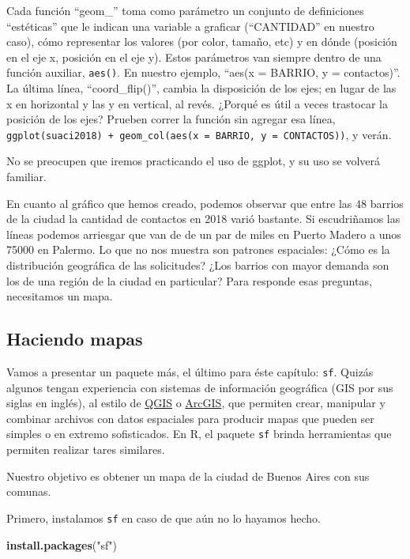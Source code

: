 \documentclass[]{book}
\newenvironment{Shaded}{\begin{snugshade}}{\end{snugshade}}
\newcommand{\KeywordTok}[1]{\textcolor[rgb]{0.13,0.29,0.53}{\textbf{#1}}}
\newcommand{\StringTok}[1]{\textcolor[rgb]{0.31,0.60,0.02}{#1}}
\newcommand{\NormalTok}[1]{#1}
\begin{document}
Cada función ``geom\_'' toma como parámetro un conjunto de definiciones
``estéticas'' que le indican una variable a graficar (``CANTIDAD'' en
nuestro caso), cómo representar los valores (por color, tamaño, etc) y
en dónde (posición en el eje x, posición en el eje y). Estos parámetros
van siempre dentro de una función auxiliar, \texttt{aes()}. En nuestro
ejemplo, ``aes(x = BARRIO, y = contactos)''. La última línea,
``coord\_flip()'', cambia la disposición de los ejes; en lugar de las x
en horizontal y las y en vertical, al revés. ¿Porqué es útil a veces
trastocar la posición de los ejes? Prueben correr la función sin agregar
esa línea,
\texttt{ggplot(suaci2018)\ +\ geom\_col(aes(x\ =\ BARRIO,\ y\ =\ CONTACTOS))},
y verán.

No se preocupen que iremos practicando el uso de ggplot, y su uso se
volverá familiar.

En cuanto al gráfico que hemos creado, podemos observar que entre las 48
barrios de la ciudad la cantidad de contactos en 2018 varió bastante. Si
escudriñamos las líneas podemos arriesgar que van de de un par de miles
en Puerto Madero a unos 75000 en Palermo. Lo que no nos muestra son
patrones espaciales: ¿Cómo es la distribución geográfica de las
solicitudes? ¿Los barrios con mayor demanda son los de una región de la
ciudad en particular? Para responde esas preguntas, necesitamos un mapa.

\subsection{Haciendo mapas}\label{haciendo-mapas}

Vamos a presentar un paquete más, el último para éste capítulo:
\texttt{sf}. Quizás algunos tengan experiencia con sistemas de
información geográfica (GIS por sus siglas en inglés), al estilo de
\href{https://qgis.org/en/site/}{QGIS} o
\href{https://www.arcgis.com/features/index.html}{ArcGIS}, que permiten
crear, manipular y combinar archivos con datos espaciales para producir
mapas que pueden ser simples o en extremo sofisticados. En R, el paquete
\texttt{sf} brinda herramientas que permiten realizar tares similares.

Nuestro objetivo es obtener un mapa de la ciudad de Buenos Aires con sus
comunas.

Primero, instalamos \texttt{sf} en caso de que aún no lo hayamos hecho.

\begin{Shaded}
\begin{Highlighting}[]
\KeywordTok{install.packages}\NormalTok{(}\StringTok{"sf"}\NormalTok{)}
\end{Highlighting}
\end{Shaded}
\end{document}
